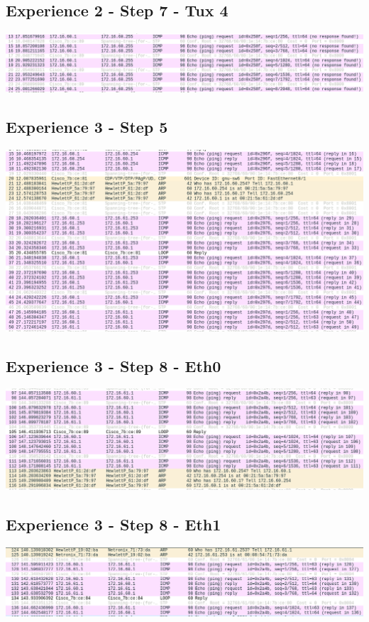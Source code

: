 \documentclass[11pt]{report}
\begin{document}
\subsection{Experience 2 - Step 7 - Tux 4}
  \includegraphics[width=1\textwidth]{images/exp2_step7_tux4.png}
\subsection{Experience 3 - Step 5}
  \includegraphics[width=1\textwidth]{images/exp3_step5.png}
\subsection{Experience 3 - Step 8 - Eth0}
  \includegraphics[width=1\textwidth]{images/exp3_step8_eth0.png}
\subsection{Experience 3 - Step 8 - Eth1}
  \includegraphics[width=1\textwidth]{images/exp3_step8_eth1.png}
\end{document}
